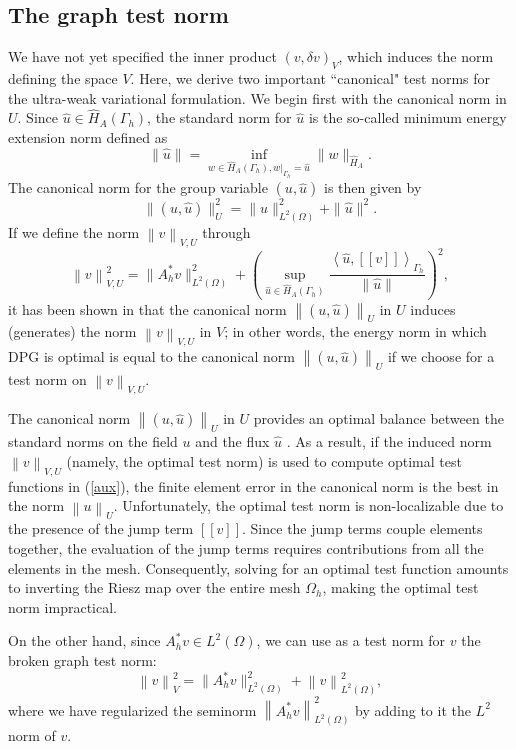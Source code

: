 \documentclass[11pt,onecolumn]{scrartcl}
\newcommand{\nor}[1]{\left\| #1 \right\|}
\newcommand{\LRp}[1]{\left( #1 \right)}
\newcommand{\LRs}[1]{\left[ #1 \right]}
\newcommand{\LRa}[1]{\left\langle #1 \right\rangle}
\newcommand{\jump}[1] {\ensuremath{\LRs{\!\left[#1\right]\!}}}
\newcommand{\uh}{\widehat{u}}
\renewcommand{\L}{L^2\LRp{\Omega}}
\newcommand{\Gh}{\Gamma_h}
\newcommand{\Oh}{\Omega_h}
\begin{document}
\subsection{The graph test norm}

We have not yet specified the inner product $\LRp{v,\delta v}_V$, which induces the norm defining the space $V$.  Here, we derive two important ``canonical" test norms for the ultra-weak variational formulation.  We begin first with the canonical norm in $U$. Since $\uh \in \widehat{H}_A(\Gh)$, the standard norm for $\uh$ is the so-called minimum energy extension norm defined as
\begin{equation*}
\|\widehat{u}\| = \inf_{w\in \widehat{H}_A(\Gamma_h),
  \left.w\right|_{\Gh}=\widehat{u}} \|w\|_{\widehat{H}_A}.
\end{equation*}
The canonical norm for the group variable $\LRp{u,\uh}$ is then given by
\[
\|\left(u,\widehat{u}\right)\|_U^2 = \|u\|^2_{\L} + \|\widehat{u}\|^2.
\]
If we define the norm $\nor{v}_{V,U}$  through
\[
\nor{v}_{V,U}^2 = \|A_h^*v\|_{\L}^2
+\left(\sup_{\widehat{u} \in \widehat{H}_A(\Gamma_h)} \frac{\LRa{ \widehat{u},
  \jump{v} }_{\Gh}}{\|\widehat{u}\|}\right)^2, 
\]
it has been shown in \cite{Bui-ThanhDemkowiczGhattas11a, ChanHeuerBui-ThanhDemkowicz12} that the canonical norm $\nor{\LRp{u,\uh}}_U$ in $U$ induces (generates) the norm $\nor{v}_{V,U}$ in $V$; in other words, the energy norm in which DPG is optimal is equal to the canonical norm $\nor{\LRp{u,\uh}}_U$ if we choose for a test norm on $\nor{v}_{V,U}$.  

The canonical norm $\nor{\LRp{u,\uh}}_U$ in $U$ provides an optimal balance between the standard norms on the field $u$ and the flux $\uh$ \cite{DPG4}. As a result, if the induced norm $\nor{v}_{V,U}$ (namely, the optimal test norm) is used to compute optimal test functions in (\ref{aux}), the finite element error in the canonical norm is the best in the norm $\nor{u}_{U}$. Unfortunately, the optimal test norm is non-localizable due to the presence of the jump term $\jump{v}$. Since the jump terms couple elements together, the evaluation of the jump terms requires contributions from all the elements in the mesh. 
Consequently, solving for an optimal test function amounts to inverting the Riesz map over the entire mesh $\Oh$, making the optimal test norm impractical.

On the other hand, since $A^*_h v \in \L$, we can use as a test norm for $v$ the broken graph test norm: 
\[
\nor{v}_V^2 =  \|A_h^*v\|_{\L}^2 + \nor{v}_{\L}^2,
\]
where we have regularized the seminorm $\nor{A_h^*v}_{\L}^2$ by adding to it the $L^2$ norm of $v$.  
\end{document}
